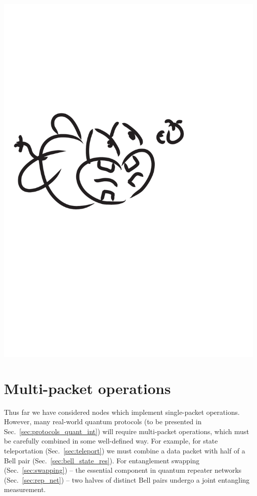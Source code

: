 \documentclass[aps, rmp, twocolumn, amsmath, amssymb, nofootinbib, superscriptaddress, longbibliography, floatfix, table-of-contents, eqsecnum]{revtex4-1}
\newcommand{\comment}[1]{{\color{blue}{\textbf{#1}}}}
\begin{document}
\begin{center}
	\includegraphics[width=0.6\columnwidth]{sketch_13}
\end{center}

%
%

\section{Multi-packet operations} 

\comment{To do}

Thus far we have considered nodes which implement single-packet operations. However, many real-world quantum protocols (to be presented in Sec.~\ref{sec:protocols_quant_int}) will require multi-packet operations, which must be carefully combined in some well-defined way. For example, for state teleportation (Sec.~\ref{sec:teleport}) we must combine a data packet with half of a Bell pair (Sec.~\ref{sec:bell_state_res}). For entanglement swapping (Sec.~\ref{sec:swapping}) -- the essential component in quantum repeater networks (Sec.~\ref{sec:rep_net}) -- two halves of distinct Bell pairs undergo a joint entangling measurement.
\end{document}
